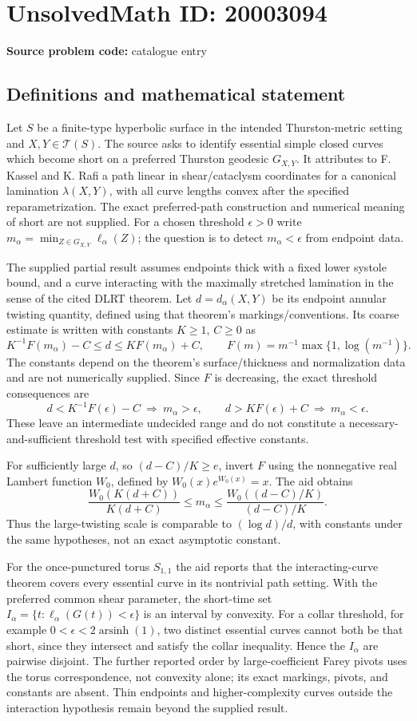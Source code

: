 \documentclass[11pt]{article}
\begin{document}
\section*{UnsolvedMath ID: 20003094}
\textbf{Source problem code:} catalogue entry
\subsection{Definitions and mathematical statement}
Let $S$ be a finite-type hyperbolic surface in the intended Thurston-metric setting and $X,Y\in\mathcal T(S)$. The source asks to identify essential simple closed curves which become short on a preferred Thurston geodesic $G_{X,Y}$. It attributes to F. Kassel and K. Rafi a path linear in shear/cataclysm coordinates for a canonical lamination $\lambda(X,Y)$, with all curve lengths convex after the specified reparametrization. The exact preferred-path construction and numerical meaning of short are not supplied. For a chosen threshold $\epsilon>0$ write $m_\alpha=\min_{Z\in G_{X,Y}}\ell_\alpha(Z)$; the question is to detect $m_\alpha<\epsilon$ from endpoint data.

The supplied partial result assumes endpoints thick with a fixed lower systole bound, and a curve interacting with the maximally stretched lamination in the sense of the cited DLRT theorem. Let $d=d_\alpha(X,Y)$ be its endpoint annular twisting quantity, defined using that theorem's markings/conventions. Its coarse estimate is written with constants $K\geq1$, $C\geq0$ as
\[
K^{-1}F(m_\alpha)-C\leq d\leq K F(m_\alpha)+C,\qquad
F(m)=m^{-1}\max\{1,\log(m^{-1})\}.
\]
The constants depend on the theorem's surface/thickness and normalization data and are not numerically supplied. Since $F$ is decreasing, the exact threshold consequences are
\[
d<K^{-1}F(\epsilon)-C\ \Longrightarrow\ m_\alpha>\epsilon,
\qquad
d>KF(\epsilon)+C\ \Longrightarrow\ m_\alpha<\epsilon.
\]
These leave an intermediate undecided range and do not constitute a necessary-and-sufficient threshold test with specified effective constants.

For sufficiently large $d$, so $(d-C)/K\geq e$, invert $F$ using the nonnegative real Lambert function $W_0$, defined by $W_0(x)e^{W_0(x)}=x$. The aid obtains
\[
\frac{W_0(K(d+C))}{K(d+C)}\leq m_\alpha\leq
\frac{W_0((d-C)/K)}{(d-C)/K}.
\]
Thus the large-twisting scale is comparable to $(\log d)/d$, with constants under the same hypotheses, not an exact asymptotic constant.

For the once-punctured torus $S_{1,1}$ the aid reports that the interacting-curve theorem covers every essential curve in its nontrivial path setting. With the preferred common shear parameter, the short-time set $I_\alpha=\{t:\ell_\alpha(G(t))<\epsilon\}$ is an interval by convexity. For a collar threshold, for example $0<\epsilon<2\operatorname{arsinh}(1)$, two distinct essential curves cannot both be that short, since they intersect and satisfy the collar inequality. Hence the $I_\alpha$ are pairwise disjoint. The further reported order by large-coefficient Farey pivots uses the torus correspondence, not convexity alone; its exact markings, pivots, and constants are absent. Thin endpoints and higher-complexity curves outside the interaction hypothesis remain beyond the supplied result.
\end{document}

